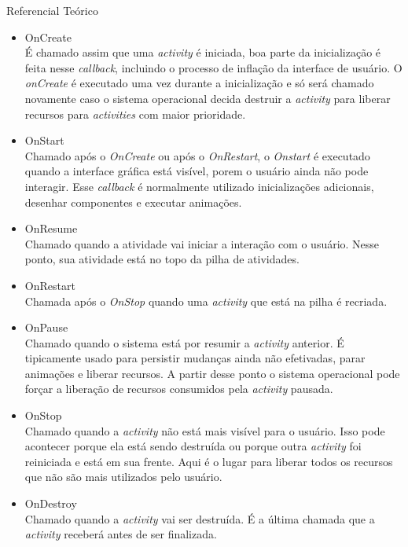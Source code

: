 \documentclass[
	12pt,				%
	openright,			%
	twoside,			%
	a4paper,			%
	english,			%
	french,				%
	spanish,			%
	brazil				%
	]{abntex2}
\begin{document}
\begin{chapter}{Referencial Teórico}
\newpage
\begin{itemize}
\item{OnCreate} \\
     É chamado assim que uma \textit{activity} é iniciada, boa parte da inicialização é feita nesse \textit{callback}, incluindo o processo de inflação da interface de usuário. O \textit{onCreate} é executado uma vez durante a inicialização e só será chamado novamente caso o sistema operacional decida destruir a \textit{activity} para liberar recursos para \textit{activities} com maior prioridade.
     \item{OnStart} \\
     Chamado após o \textit{OnCreate} ou após o \textit{OnRestart}, o \textit{Onstart} é executado quando a interface gráfica está visível, porem o usuário ainda não pode interagir. Esse \textit{callback} é normalmente utilizado inicializações adicionais, desenhar componentes e executar animações.
     \item{OnResume} \\
      Chamado quando a atividade vai iniciar a interação com o usuário. Nesse ponto, sua atividade está no topo da pilha de atividades.
      \item{OnRestart} \\
      Chamada após o \textit{OnStop} quando uma \textit{activity} que está na pilha é recriada.
     \item{OnPause} \\
     Chamado quando o sistema está por resumir a \textit{activity} anterior. É tipicamente usado para persistir mudanças ainda não efetivadas, parar animações e liberar recursos. A partir desse ponto o sistema operacional pode forçar a liberação de recursos consumidos pela \textit{activity} pausada.
     \item{OnStop} \\
    Chamado quando a \textit{activity} não está mais visível para o usuário. Isso pode acontecer porque ela está sendo destruída ou porque outra  \textit{activity} foi reiniciada e está em sua frente. Aqui é o lugar para liberar todos os recursos que não são mais utilizados pelo usuário.
     \item{OnDestroy} \\
     Chamado quando a \textit{activity} vai ser destruída. É a última chamada que a \textit{activity} receberá antes de ser finalizada.
  \end{itemize}

\newpage

\end{chapter}
\end{document}
